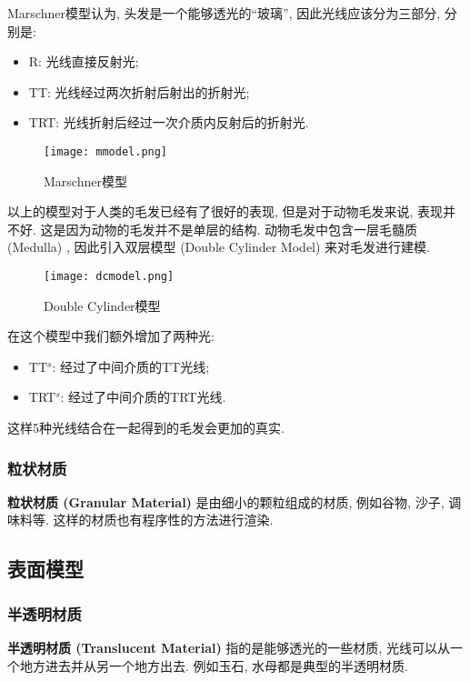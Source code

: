 Marschner模型认为, 头发是一个能够透光的``玻璃”, 因此光线应该分为三部分, 分别是: 
\begin{itemize}
	\item R: 光线直接反射光; 
	\item TT: 光线经过两次折射后射出的折射光; 
	\item TRT: 光线折射后经过一次介质内反射后的折射光. 
\end{itemize}

\begin{figure}[H]
	\centering
	\texttt{[image: mmodel.png]}
	\caption{Marschner模型}
	\label{fig:mm}
\end{figure}

以上的模型对于人类的毛发已经有了很好的表现, 但是对于动物毛发来说, 表现并不好. 这是因为动物的毛发并不是单层的结构. 动物毛发中包含一层毛髓质 (Medulla) , 因此引入双层模型 (Double Cylinder Model) 来对毛发进行建模. 

\begin{figure}[H]
	\centering
	\texttt{[image: dcmodel.png]}
	\caption{Double Cylinder模型}
	\label{fig:dc}
\end{figure}

在这个模型中我们额外增加了两种光: 
\begin{itemize}
	\item TT$^s$: 经过了中间介质的TT光线; 
	\item TRT$^s$: 经过了中间介质的TRT光线. 
\end{itemize}

这样5种光线结合在一起得到的毛发会更加的真实. 

\subsubsection{粒状材质}

\textbf{粒状材质 (Granular Material) }是由细小的颗粒组成的材质, 例如谷物, 沙子, 调味料等. 这样的材质也有程序性的方法进行渲染. 

\subsection{表面模型}

\subsubsection{半透明材质}

\textbf{半透明材质 (Translucent Material) }指的是能够透光的一些材质, 光线可以从一个地方进去并从另一个地方出去. 例如玉石, 水母都是典型的半透明材质. 


